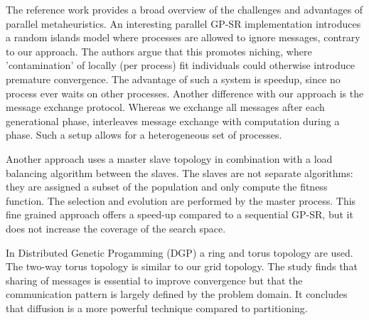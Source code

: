 The reference work \cite{parallelmetaheuristics} provides a broad overview of the challenges and advantages of parallel metaheuristics. An interesting parallel GP-SR implementation \citep{DGPSR} introduces a random islands model where processes are allowed to ignore messages, contrary to our approach. The authors argue that this promotes niching, where 'contamination' of locally (per process) fit individuals could otherwise introduce premature convergence. The advantage of such a system is speedup, since no process ever waits on other processes. Another difference with our approach is the message exchange protocol. 
Whereas we exchange all messages after each generational phase, \citep{DGPSR} interleaves message exchange with computation during a phase. Such a setup allows for a heterogeneous set of processes. 

Another approach \citep{DFGPSR} uses a master slave topology in combination with a load balancing algorithm between the slaves. The slaves are not separate algorithms: they are assigned a subset of the population and only compute the fitness function. The selection and evolution are performed by the master process. This fine grained approach offers a speed-up compared to a sequential GP-SR, but it does not increase the coverage of the search space. 

In Distributed Genetic Progamming (DGP) \cite{DGP} a ring and torus topology are used. The two-way torus topology is similar to our grid topology. The study finds that sharing of messages is essential to improve convergence but that the communication pattern is largely defined by the problem domain. It concludes that diffusion is a more powerful technique compared to partitioning. 